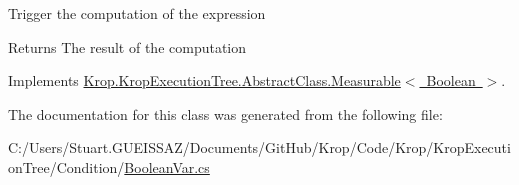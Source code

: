 Trigger the computation of the expression 

\begin{DoxyReturn}{Returns}
The result of the computation 
\end{DoxyReturn}


Implements \mbox{\hyperlink{class_krop_1_1_krop_execution_tree_1_1_abstract_class_1_1_measurable_afe91c739e2db11c8f316b07e8f55f7bb}{Krop.\+Krop\+Execution\+Tree.\+Abstract\+Class.\+Measurable$<$ Boolean $>$}}.



The documentation for this class was generated from the following file\+:\begin{DoxyCompactItemize}
\item 
C\+:/\+Users/\+Stuart.\+G\+U\+E\+I\+S\+S\+A\+Z/\+Documents/\+Git\+Hub/\+Krop/\+Code/\+Krop/\+Krop\+Execution\+Tree/\+Condition/\mbox{\hyperlink{_boolean_var_8cs}{Boolean\+Var.\+cs}}\end{DoxyCompactItemize}
